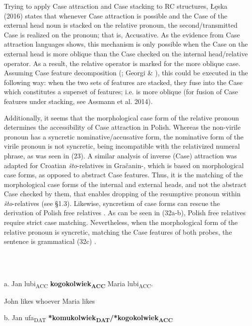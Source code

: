 \documentclass[output=paper]{langsci/langscibook}
\begin{document}
Trying to apply Case attraction and Case stacking to RC structures, Łęska (2016) states that whenever Case attraction is possible and the Case of the external head noun is stacked on the relative pronoun, the second/transmitted Case is realized on the pronoun; that is, Accusative. As the evidence from Case attraction languages shows, this mechanism is only possible when the Case on the external head is more oblique than the Case checked on the internal head/relative operator. As a result, the relative operator is marked for the more oblique case. Assuming Case feature decomposition (\citealt{Assmann2013}; Georgi \& \citealt{Salzmann2014}), this could be executed in the following way: when the two sets of features are stacked, they fuse into the Case which constitutes a superset of features; i.e. is more oblique (for fusion of Case features under stacking, see Assmann et al. 2014).

Additionally, it seems that the morphological case form of the relative pronoun determines the accessibility of Case attraction in Polish. Whereas the non-virile pronoun has a syncretic nominative/accusative form, the nominative form of the virile pronoun is not syncretic, being incompatible with the relativized numeral phrase, as was seen in (23). A similar analysis of inverse (Case) attraction was adapted for Croatian \textit{što}{}-relatives in Gračanin-\citet{Yuksek2013}, which is based on morphological case forms, as opposed to abstract Case features. Thus, it is the matching of the morphological case forms of the internal and external heads, and not the abstract Case checked by them, that enables dropping of the resumptive pronoun within \textit{što}{}-relatives (see §1.3). Likewise, syncretism of case forms can rescue the derivation of Polish free relatives \citep{Assmann2014}. As can be seen in (32a-b), Polish free relatives require strict case matching. Nevertheless, when the morphological form of the relative pronoun is syncretic, matching the Case features of both probes, the sentence is grammatical (32c) \citep[3]{Assmann2014}. 

\ea%
    \label{ex:key:32}
    \gll\\
        \\
    \glt
    \z

          a.   Jan   lubi\textsubscript{ACC}   \textbf{kogokolwiek\textsubscript{ACC}}   Maria lubi\textsubscript{ACC}.

      John   likes     whoever     Maria likes

  b.   Jan  ufa\textsubscript{DAT}   \textbf{*komukolwiek\textsubscript{DAT}}\textbf{/*kogokolwiek\textsubscript{ACC}} 
\end{document}
